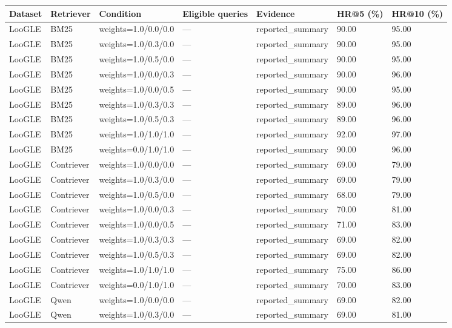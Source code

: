 \begin{tabular}{lllllll}
\hline
Dataset & Retriever & Condition & Eligible queries & Evidence & HR@5 (\%) & HR@10 (\%) \\
\hline
LooGLE & BM25 & weights=1.0/0.0/0.0 & — & reported\_summary & 90.00 & 95.00 \\
LooGLE & BM25 & weights=1.0/0.3/0.0 & — & reported\_summary & 90.00 & 95.00 \\
LooGLE & BM25 & weights=1.0/0.5/0.0 & — & reported\_summary & 90.00 & 95.00 \\
LooGLE & BM25 & weights=1.0/0.0/0.3 & — & reported\_summary & 90.00 & 96.00 \\
LooGLE & BM25 & weights=1.0/0.0/0.5 & — & reported\_summary & 90.00 & 95.00 \\
LooGLE & BM25 & weights=1.0/0.3/0.3 & — & reported\_summary & 89.00 & 96.00 \\
LooGLE & BM25 & weights=1.0/0.5/0.3 & — & reported\_summary & 89.00 & 96.00 \\
LooGLE & BM25 & weights=1.0/1.0/1.0 & — & reported\_summary & 92.00 & 97.00 \\
LooGLE & BM25 & weights=0.0/1.0/1.0 & — & reported\_summary & 90.00 & 96.00 \\
LooGLE & Contriever & weights=1.0/0.0/0.0 & — & reported\_summary & 69.00 & 79.00 \\
LooGLE & Contriever & weights=1.0/0.3/0.0 & — & reported\_summary & 69.00 & 79.00 \\
LooGLE & Contriever & weights=1.0/0.5/0.0 & — & reported\_summary & 68.00 & 79.00 \\
LooGLE & Contriever & weights=1.0/0.0/0.3 & — & reported\_summary & 70.00 & 81.00 \\
LooGLE & Contriever & weights=1.0/0.0/0.5 & — & reported\_summary & 71.00 & 83.00 \\
LooGLE & Contriever & weights=1.0/0.3/0.3 & — & reported\_summary & 69.00 & 82.00 \\
LooGLE & Contriever & weights=1.0/0.5/0.3 & — & reported\_summary & 69.00 & 82.00 \\
LooGLE & Contriever & weights=1.0/1.0/1.0 & — & reported\_summary & 75.00 & 86.00 \\
LooGLE & Contriever & weights=0.0/1.0/1.0 & — & reported\_summary & 70.00 & 83.00 \\
LooGLE & Qwen & weights=1.0/0.0/0.0 & — & reported\_summary & 69.00 & 82.00 \\
LooGLE & Qwen & weights=1.0/0.3/0.0 & — & reported\_summary & 69.00 & 81.00 \\

\end{tabular}
